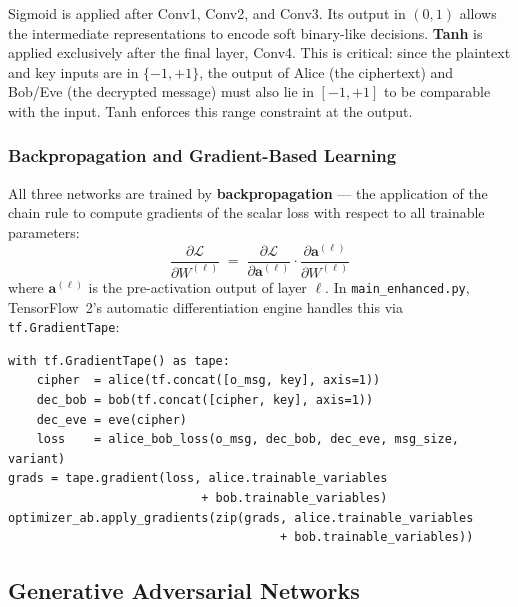 \documentclass[12pt, a4paper]{article}
\newcommand{\code}[1]{\texttt{\color{CodeRed}#1}}
\begin{document}
Sigmoid is applied after Conv1, Conv2, and Conv3. Its output in $(0,1)$
allows the intermediate representations to encode soft binary-like
decisions. \textbf{Tanh} is applied exclusively after the final layer,
Conv4. This is critical: since the plaintext and key inputs are in
$\{-1,+1\}$, the output of Alice (the ciphertext) and Bob/Eve
(the decrypted message) must also lie in $[-1,+1]$ to be comparable
with the input. Tanh enforces this range constraint at the output.

\subsubsection*{Backpropagation and Gradient-Based Learning}

All three networks are trained by \textbf{backpropagation} — the
application of the chain rule to compute gradients of the scalar loss
with respect to all trainable parameters:
%
\begin{equation}
  \frac{\partial \mathcal{L}}{\partial W^{(\ell)}}
  \;=\;
  \frac{\partial \mathcal{L}}{\partial \mathbf{a}^{(\ell)}}
  \cdot
  \frac{\partial \mathbf{a}^{(\ell)}}{\partial W^{(\ell)}}
  \label{eq:backprop}
\end{equation}
%
where $\mathbf{a}^{(\ell)}$ is the pre-activation output of layer $\ell$.
In \code{main\_enhanced.py}, TensorFlow~2's automatic differentiation
engine handles this via \code{tf.GradientTape}:

\begin{lstlisting}[caption={Gradient computation using \code{tf.GradientTape}}]
with tf.GradientTape() as tape:
    cipher  = alice(tf.concat([o_msg, key], axis=1))
    dec_bob = bob(tf.concat([cipher, key], axis=1))
    dec_eve = eve(cipher)
    loss    = alice_bob_loss(o_msg, dec_bob, dec_eve, msg_size, variant)
grads = tape.gradient(loss, alice.trainable_variables
                           + bob.trainable_variables)
optimizer_ab.apply_gradients(zip(grads, alice.trainable_variables
                                      + bob.trainable_variables))
\end{lstlisting}

\subsection{Generative Adversarial Networks}
\label{subsec:gans}
\end{document}
